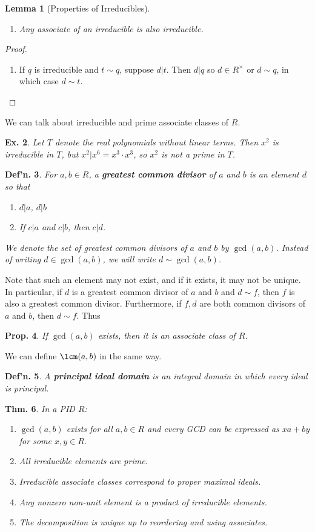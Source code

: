 \documentclass[12pt, a4paper]{book}
\newtheorem{theorem}{Thm.}[section]
\newtheorem{lemma}[theorem]{Lemma}
\newtheorem{definition}[theorem]{Def'n.}
\newtheorem{proposition}[theorem]{Prop.}
\newtheorem{example}[theorem]{Ex.}
\theoremstyle{nonumberplain}
\newtheorem{proof}{Proof}
\begin{document}
\begin{lemma}[Properties of Irreducibles]
    \begin{enumerate}[nolistsep]
        \item Any associate of an irreducible is also irreducible.
    \end{enumerate}
\end{lemma}
\begin{proof}
    \begin{enumerate}[nolistsep]
        \item If $q$ is irreducible and $t\sim q$, suppose $d|t$.
            Then $d|q$ so $d\in R^\times$ or $d\sim q$, in which case $d\sim t$.
    \end{enumerate}
\end{proof}
We can talk about irreducible and prime associate classes of $R$.
\begin{example}
    Let $T$ denote the real polynomials without linear terms.
    Then $x^2$ is irreducible in $T$, but $x^2|x^6=x^3\cdot x^3$, so $x^2$ is not a prime in $T$.
\end{example}
\begin{definition}
    For $a,b\in R$, a \textbf{greatest common divisor} of $a$ and $b$ is an element $d$ so that
    \begin{enumerate}
        \item $d|a$, $d|b$
        \item If $c|a$ and $c|b$, then $c|d$.
    \end{enumerate}
    We denote the set of greatest common divisors of $a$ and $b$ by $\gcd(a,b)$.
    Instead of writing $d\in \gcd(a,b)$, we will write $d\sim\gcd(a,b)$.
\end{definition}
Note that such an element may not exist, and if it exists, it may not be unique.
In particular, if $d$ is a greatest common divisor of $a$ and $b$ and $d\sim f$, then $f$ is also a greatest common divisor.
Furthermore, if $f,d$ are both common divisors of $a$ and $b$, then $d\sim f$.
Thus
\begin{proposition}
    If $\gcd(a,b)$ exists, then it is an associate class of $R$.
\end{proposition}
We can define $\lcm(a,b)$ in the same way.
\begin{definition}
    A \textbf{principal ideal domain} is an integral domain in which every ideal is principal.
\end{definition}
\begin{theorem}
    In a PID $R$:
    \begin{enumerate}[nolistsep]
        \item $\gcd(a,b)$ exists for all $a,b\in R$ and every GCD can be expressed as $xa+by$ for some $x,y\in R$.
        \item All irreducible elements are prime.
        \item Irreducible associate classes correspond to proper maximal ideals.
        \item Any nonzero non-unit element is a product of irreducible elements.
        \item The decomposition is unique up to reordering and using associates.
    \end{enumerate}
\end{theorem}
\end{document}
